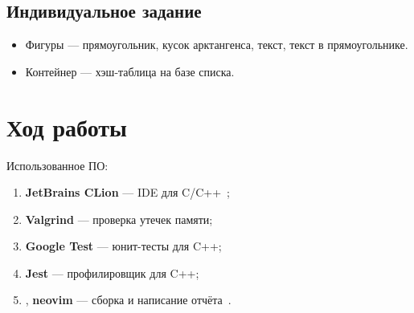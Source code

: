\documentclass[a4paper, 14pt]{extarticle}
\begin{document}
\subsection{Индивидуальное задание}
\begin{itemize}
    \item Фигуры --- прямоугольник, кусок арктангенса, текст, текст в прямоугольнике.
    \item Контейнер --- хэш-таблица на базе списка.
\end{itemize}

\section{Ход работы}
Использованное ПО:
\begin{enumerate}
    \item \textbf{JetBrains CLion} --- IDE для C/C++~\cite{clion};
    \item \textbf{Valgrind} --- проверка утечек памяти;
    \item \textbf{Google Test} --- юнит-тесты для C++;
    \item \textbf{Jest} --- профилировщик для C++;
    \item \XeLaTeX{}, \textbf{neovim} --- сборка и написание отчёта~\cite{latex}.
\end{enumerate}
\end{document}
